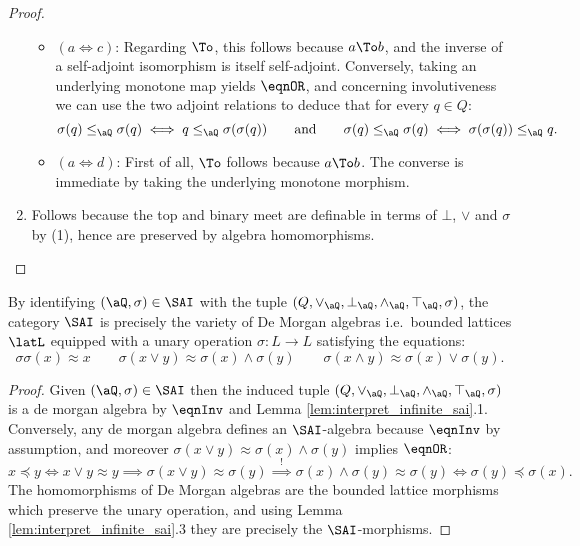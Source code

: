 \documentclass{article}
\begin{document}
\begin{proof}
\begin{enumerate}
\begin{itemize}
\item
$(a \iff c)$: Regarding $\To$, this follows because $a \To b$, and the inverse of a self-adjoint isomorphism is itself self-adjoint. Conversely, taking an underlying monotone map yields $\eqnOR$, and concerning involutiveness we can use the two adjoint relations to deduce that for every $q \in Q$:
\[
\sigma(q) \leq_\aQ \sigma(q) \iff q \leq_\aQ \sigma(\sigma(q))
\qquad\text{and}\qquad
\sigma(q) \leq_\aQ \sigma(q) \iff \sigma(\sigma(q)) \leq_\aQ q.
\]

\item
$(a \iff d)$: First of all, $\To$ follows because $a \To b$. The converse is immediate by taking the underlying monotone morphism.

\end{itemize}

\item
Follows because the top and binary meet are definable in terms of $\bot$, $\lor$ and $\sigma$ by (1), hence are preserved by algebra homomorphisms.

\end{enumerate}
\end{proof}


\begin{corollary}
\item
By identifying $(\aQ,\sigma) \in \SAI$ with the tuple $(Q,\lor_\aQ,\bot_\aQ,\land_\aQ,\top_\aQ,\sigma)$, the category $\SAI$ is precisely the variety of De Morgan algebras i.e.\ bounded lattices $\latL$ equipped with a unary operation $\sigma : L \to L$ satisfying the equations:
\[
\sigma\sigma(x) \approx x
\qquad
\sigma(x \lor y) \approx \sigma(x) \land \sigma(y)
\qquad
\sigma(x \land y) \approx \sigma(x) \lor \sigma(y).
\]
\end{corollary}

\begin{proof}
Given $(\aQ,\sigma) \in \SAI$ then the induced tuple $(Q,\lor_\aQ,\bot_\aQ,\land_\aQ,\top_\aQ,\sigma)$ is a de morgan algebra by $\eqnInv$ and Lemma \ref{lem:interpret_infinite_sai}.1. Conversely, any de morgan algebra defines an $\SAI$-algebra because $\eqnInv$ by assumption, and moreover $\sigma(x \lor y) \approx \sigma(x) \land \sigma(y)$ implies $\eqnOR$:
\[
x \preccurlyeq y \iff x \lor y \approx y \implies \sigma(x \lor y) \approx \sigma(y) \stackrel{!}{\implies} \sigma(x) \land \sigma(y) \approx \sigma(y) \iff \sigma(y) \preccurlyeq \sigma(x).
\]
The homomorphisms of De Morgan algebras are the bounded lattice morphisms which preserve the unary operation, and using Lemma \ref{lem:interpret_infinite_sai}.3 they are precisely the $\SAI$-morphisms.
\end{proof}
\end{document}
